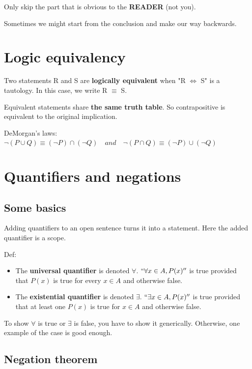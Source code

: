 \documentclass[letterpaper,12pt]{article}
\begin{document}
Only skip the part that is obvious to the \textbf{READER} (not you). 

Sometimes we might start from the conclusion and make our way backwards. 

\section{Logic equivalency}

Two statements R and S are \textbf{logically equivalent} when "R $\iff$ S" is a tautology. In this case, we write R $\equiv$ S. 

Equivalent statements share \textbf{the same truth table}. So contrapositive is equivalent to the original implication. 

DeMorgan's laws: $\neg (P\cup Q)\equiv (\neg P)\cap (\neg Q) \quad and\quad \neg (P\cap Q)\equiv (\neg P)\cup (\neg Q)$

\section{Quantifiers and negations}

\subsection{Some basics}

Adding quantifiers to an open sentence turns it into a statement. Here the added quantifier is a scope.

Def:
\begin{itemize}
    \item The \textbf{universal quantifier} is denoted $\forall$.
    $``\forall x\in A,P(x)''$ is true provided that $P(x)$ is true for every $x\in A$ and otherwise false.

    \item The \textbf{existential quantifier} is denoted $\exists$.
    $``\exists x\in A,P(x)''$ is true provided that at least one $P(x)$ is true for $x\in A$ and otherwise false.

\end{itemize}

To show $\forall$ is true or $\exists$ is false, you have to show it generically. Otherwise, one example of the case is good enough.

\subsection{Negation theorem}
\end{document}
